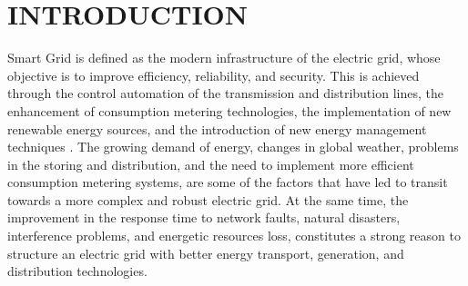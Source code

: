 \documentclass[10pt,twocolumn,twoside,submit]{JCNtran}
\begin{document}
\section{\uppercase{Introduction}}
\label{sec:introd}

Smart Grid is defined as the modern infrastructure of the electric grid, whose objective is to improve efficiency, reliability, and security. This is achieved through the control automation of the transmission and distribution lines, the enhancement of consumption metering technologies, the implementation of new renewable energy sources, and the introduction of new energy management techniques \cite{Gungor2011}. The growing demand of energy, changes in global weather, problems in the storing and distribution, and the need to implement more efficient consumption metering systems, are some of the factors that have led to transit towards a more complex and robust electric grid. At the same time, the improvement in the response time to network faults, natural disasters, interference problems, and energetic resources loss, constitutes a strong reason to structure an electric grid with better energy transport, generation, and distribution technologies.

\end{document}
